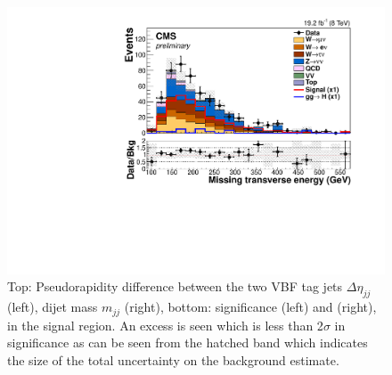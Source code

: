 \begin{figure}
\begin{center}
    \includegraphics[width=.65\largefigwidth]{plots/parked/HIG-14-038-figs/output_sigreg/nunu_metnomuons.pdf}

    \caption{Top: Pseudorapidity difference between the two VBF tag jets $\Delta\eta_{jj}$ (left), dijet mass $m_{jj}$ (right),  bottom: \MET significance \METsig (left) and \MET (right), in the signal region. An excess is seen which is less than 2$\sigma$ in significance as can be seen from the hatched band which indicates the size of the total uncertainty on the background estimate.}%
   \label{fig:parkednunucontplots}
  \end{center}
\end{figure}

